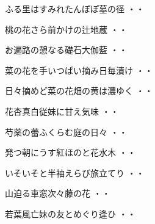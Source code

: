 \vspace{0.6cm}
\begin{shiika}ふる里はすみれたんぽぽ墓の径
\hfill{・・}\end{shiika}
\vspace{0.6cm}
\begin{shiika}桃の花さら前かけの辻地蔵
\hfill{・・}\end{shiika}
\vspace{0.6cm}
\begin{shiika}お遍路の憩なる礎石大伽藍
\hfill{・・}\end{shiika}
\vspace{0.6cm}
\begin{shiika}菜の花を手いつぱい摘み日毎漬け
\hfill{・・}\end{shiika}
\vspace{0.6cm}
\begin{shiika}日々摘めど菜の花畑の黄は濃ゆく
\hfill{・・}\end{shiika}
\vspace{0.6cm}
\begin{shiika}花杏真白従妹に甘え気味
\hfill{・・}\end{shiika}
\vspace{0.6cm}
\begin{shiika}芍薬の蕾ふくらむ庭の日々
\hfill{・・}\end{shiika}
\vspace{0.6cm}
\begin{shiika}発つ朝にうす紅ほのと花水木
\hfill{・・}\end{shiika}
\vspace{0.6cm}
\begin{shiika}いそいそと半袖えらび旅立てり
\hfill{・・}\end{shiika}
\vspace{0.6cm}
\begin{shiika}山迫る車窓次々藤の花
\hfill{・・}\end{shiika}
\vspace{0.6cm}
\begin{shiika}若葉風亡妹の友とめぐり逢ひ
\hfill{・・}\end{shiika}

